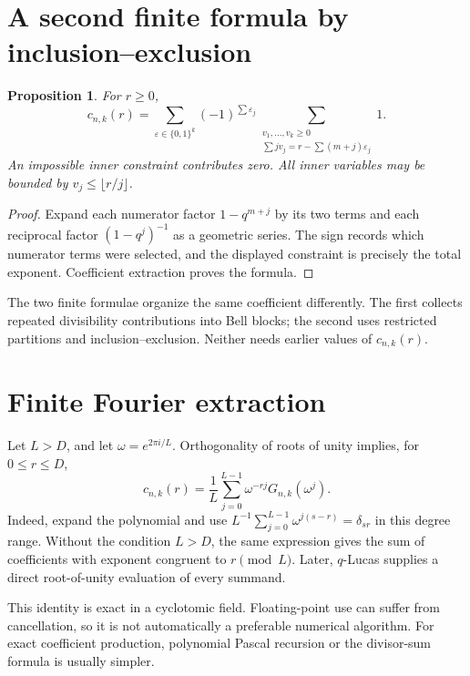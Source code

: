 \documentclass[11pt,a4paper,oneside,openany]{book}
\newtheorem{proposition}[theorem]{Proposition}
\theoremstyle{definition}
\theoremstyle{remark}
\begin{document}
\section{A second finite formula by inclusion--exclusion}
\begin{proposition}\label{q1:qcc:coefficient-inclusion}
For \(r\ge0\),
\begin{equation}\label{q1:qcc:coefficient-inclusion-formula}
 c_{n,k}(r)=\sum_{\varepsilon\in\{0,1\}^k}(-1)^{\sum\varepsilon_j}
 \sum_{\substack{v_1,\ldots,v_k\ge0\\
       \sum jv_j=r-\sum(m+j)\varepsilon_j}}1.
\end{equation}
An impossible inner constraint contributes zero. All inner variables may be
bounded by \(v_j\le\lfloor r/j\rfloor\).
\end{proposition}
\begin{proof}
Expand each numerator factor \(1-q^{m+j}\) by its two terms and each reciprocal
factor \((1-q^j)^{-1}\) as a geometric series. The sign records which numerator
terms were selected, and the displayed constraint is precisely the total
exponent. Coefficient extraction proves the formula.
\end{proof}
The two finite formulae organize the same coefficient differently. The first
collects repeated divisibility contributions into Bell blocks; the second uses
restricted partitions and inclusion--exclusion. Neither needs earlier values of
\(c_{n,k}(r)\).

\section{Finite Fourier extraction}
Let \(L>D\), and let \(\omega=e^{2\pi i/L}\). Orthogonality of roots of unity
implies, for \(0\le r\le D\),
\begin{equation}\label{q1:qcc:fourier-coefficient}
 c_{n,k}(r)=\frac1L\sum_{j=0}^{L-1}\omega^{-rj}G_{n,k}(\omega^j).
\end{equation}
Indeed, expand the polynomial and use
\(L^{-1}\sum_{j=0}^{L-1}\omega^{j(s-r)}=\delta_{sr}\) in this degree range.
Without the condition \(L>D\), the same expression gives the sum of coefficients
with exponent congruent to \(r\pmod L\). Later, \(q\)-Lucas supplies a direct
root-of-unity evaluation of every summand.

This identity is exact in a cyclotomic field. Floating-point use can suffer from
cancellation, so it is not automatically a preferable numerical algorithm. For
exact coefficient production, polynomial Pascal recursion or the divisor-sum
formula is usually simpler.
\end{document}
